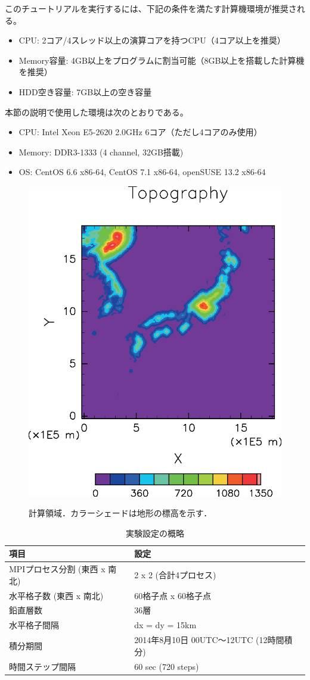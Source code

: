 このチュートリアルを実行するには、下記の条件を満たす計算機環境が推奨される。
\begin{itemize}
\item CPU: 2コア/4スレッド以上の演算コアを持つCPU（4コア以上を推奨）
\item Memory容量: 4GB以上をプログラムに割当可能（8GB以上を搭載した計算機を推奨）
\item HDD空き容量: 7GB以上の空き容量
\end{itemize}
本節の説明で使用した環境は次のとおりである。
\begin{itemize}
\item CPU: Intel Xeon E5-2620 2.0GHz 6コア（ただし4コアのみ使用）
\item Memory: DDR3-1333 (4 channel, 32GB搭載)
\item OS: CentOS 6.6 x86-64, CentOS 7.1 x86-64, openSUSE 13.2 x86-64
\end{itemize}

\begin{figure}[tb]
\begin{center}
  \includegraphics[width=0.5\hsize]{./figure/real_domain.eps}\\
  \caption{計算領域．カラーシェードは地形の標高を示す．}
  \label{fig:domain}
\end{center}
\end{figure}

\begin{table}[h]
\begin{center}
  \caption{実験設定の概略}
  \label{tab:grids}
  \begin{tabularx}{150mm}{|l|X|} \hline
    \rowcolor[gray]{0.9} 項目 & 設定 \\ \hline
    MPIプロセス分割 (東西 x 南北) & 2 x 2 (合計4プロセス) \\ \hline
    水平格子数 (東西 x 南北) & 60格子点 x 60格子点 \\ \hline
    鉛直層数                 & 36層                  \\ \hline
    水平格子間隔             & dx = dy = 15km       \\ \hline
    積分期間 & 2014年8月10日 00UTC～12UTC (12時間積分) \\ \hline
    時間ステップ間隔 & 60 sec (720 steps) \\ \hline
  \end{tabularx}
\end{center}
\end{table}


